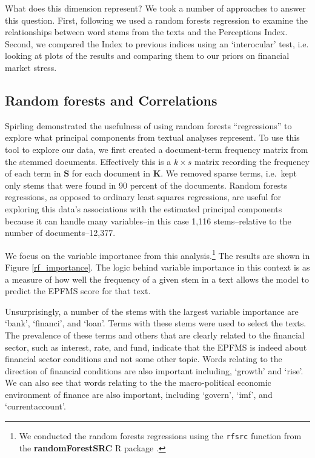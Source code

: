 \documentclass[]{article}
\begin{document}
What does this dimension represent? We took a number of approaches to
answer this question. First, following \cite{Spirling2012} we used a random
forests regression \citep{Breiman2001,jones2015} to examine the
relationships between word stems from the texts and the Perceptions
Index. Second, we compared the Index to previous indices using an
`interocular' test, i.e. looking at plots of the results and comparing
them to our priors on financial market stress.

\subsection{Random forests and Correlations}\label{random-forests}

Spirling \citeyearpar[6--8]{Spirling2012} demonstrated the usefulness of using random forests
``regressions'' to explore what principal components from textual
analyses represent. To use this tool to explore our data, we first created a document-term
frequency matrix from the stemmed documents. Effectively this is a
\(k \times s\) matrix recording the frequency of each term in \(\bm{S}\)
for each document in \(\bm{K}\). We removed sparse terms, i.e.~kept only
stems that were found in 90 percent of the documents. Random forests
regressions, as opposed to ordinary least squares regressions, are useful
for exploring this data's associations with the estimated principal components because it can handle many variables--in this case 1,116 stems--relative to the number of documents--12,377.

We focus on the variable importance from this analysis.\footnote{We conducted the random forests regressions using the \texttt{rfsrc} function from the
\textbf{randomForestSRC} R package \citep{randomForestSRCCite}.} The results are shown in Figure \ref{rf_importance}. The logic behind variable importance in this context is as a measure of how well the frequency of a given stem in a text allows the model to predict the EPFMS score for that text.

Unsurprisingly, a number of the stems with the largest variable importance are `bank', `financi', and `loan'. Terms with these stems were used to select the texts. The prevalence of these terms and others that are clearly related to the financial sector, such as interest, rate, and fund, indicate that the EPFMS is indeed about financial sector conditions and not some other topic. Words relating to the direction of financial conditions are also important including, `growth' and `rise'. We can also see that words relating to the the macro-political economic environment of finance are also important, including `govern', `imf', and `currentaccount'.
\end{document}
